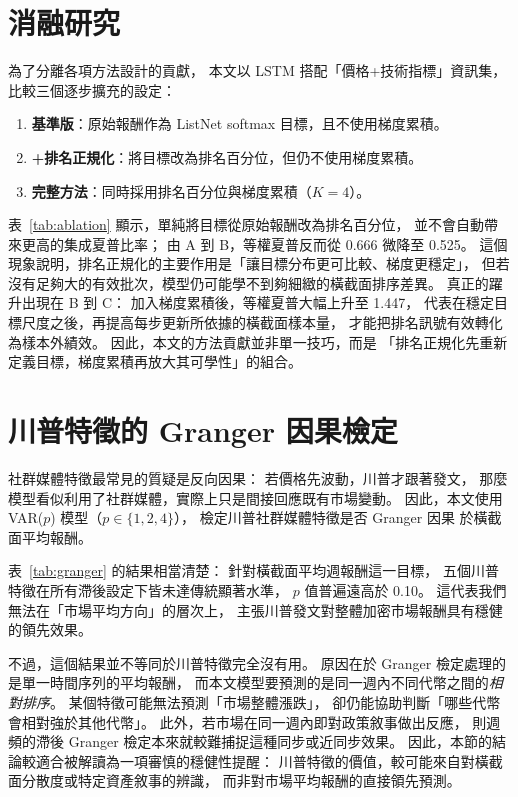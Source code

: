 
\section{消融研究}
\label{sec:analysis:ablation}

為了分離各項方法設計的貢獻，
本文以 LSTM 搭配「價格+技術指標」資訊集，
比較三個逐步擴充的設定：
\begin{enumerate}[label=(\Alph*)]
  \item \textbf{基準版}：原始報酬作為 ListNet softmax 目標，且不使用梯度累積。
  \item \textbf{+排名正規化}：將目標改為排名百分位，但仍不使用梯度累積。
  \item \textbf{完整方法}：同時採用排名百分位與梯度累積（$K=4$）。
\end{enumerate}



表~\ref{tab:ablation} 顯示，單純將目標從原始報酬改為排名百分位，
並不會自動帶來更高的集成夏普比率；
由 A 到 B，等權夏普反而從 0.666 微降至 0.525。
這個現象說明，排名正規化的主要作用是「讓目標分布更可比較、梯度更穩定」，
但若沒有足夠大的有效批次，模型仍可能學不到夠細緻的橫截面排序差異。
真正的躍升出現在 B 到 C：
加入梯度累積後，等權夏普大幅上升至 1.447，
代表在穩定目標尺度之後，再提高每步更新所依據的橫截面樣本量，
才能把排名訊號有效轉化為樣本外績效。
因此，本文的方法貢獻並非單一技巧，而是
「排名正規化先重新定義目標，梯度累積再放大其可學性」的組合。

\section{川普特徵的 Granger 因果檢定}
\label{sec:analysis:granger}

社群媒體特徵最常見的質疑是反向因果：
若價格先波動，川普才跟著發文，
那麼模型看似利用了社群媒體，實際上只是間接回應既有市場變動。
因此，本文使用 VAR($p$) 模型（$p \in \{1, 2, 4\}$），
檢定川普社群媒體特徵是否 Granger 因果
\citep{granger1969investigating} 於橫截面平均報酬。



表~\ref{tab:granger} 的結果相當清楚：
針對橫截面平均週報酬這一目標，
五個川普特徵在所有滯後設定下皆未達傳統顯著水準，
$p$ 值普遍遠高於 0.10。
這代表我們無法在「市場平均方向」的層次上，
主張川普發文對整體加密市場報酬具有穩健的領先效果。

不過，這個結果並不等同於川普特徵完全沒有用。
原因在於 Granger 檢定處理的是單一時間序列的平均報酬，
而本文模型要預測的是同一週內不同代幣之間的\emph{相對排序}。
某個特徵可能無法預測「市場整體漲跌」，
卻仍能協助判斷「哪些代幣會相對強於其他代幣」。
此外，若市場在同一週內即對政策敘事做出反應，
則週頻的滯後 Granger 檢定本來就較難捕捉這種同步或近同步效果。
因此，本節的結論較適合被解讀為一項審慎的穩健性提醒：
川普特徵的價值，較可能來自對橫截面分散度或特定資產敘事的辨識，
而非對市場平均報酬的直接領先預測。

